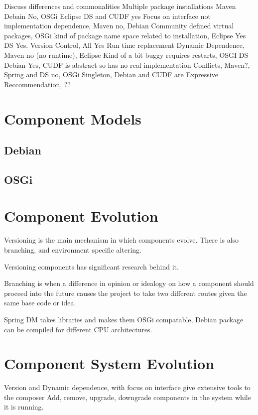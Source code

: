 Discuss differences and commonalities
Multiple package installations Maven Debain No, OSGi Eclipse DS and CUDF yes
Focus on interface not implementation dependence, Maven no, Debian Community defined virtual packages, 
OSGi kind of package name space related to installation, Eclipse Yes DS Yes.
Version Control, All Yes
Run time replacement Dynamic Dependence, Maven no (no runtime), Eclipse Kind of a bit buggy requires restarts,
OSGI DS Debian Yes, CUDF is abstract so has no real implementation
Conflicts, Maven?, Spring and DS no,  OSGi Singleton, Debian and CUDF are Expressive
Reccommendation, ??

\section{Component Models}

\subsection{Debian}


\subsection{OSGi}

\section{Component Evolution}
Versioning is the main mechanism in which components evolve.
There is also branching, and environment specific altering.

Versioning components has significant research behind it.

Branching is when a difference in opinion or idealogy on how a component should proceed into the future
causes the project to take two different routes given the same base code or idea.

Spring DM takes libraries and makes them OSGi compatable, 
Debian package can be compiled for different CPU architectures.


\section{Component System Evolution}
Version and Dynamic dependence, with focus on interface give extensive tools to the composer 
Add, remove, upgrade, downgrade components in the system while it is running.

